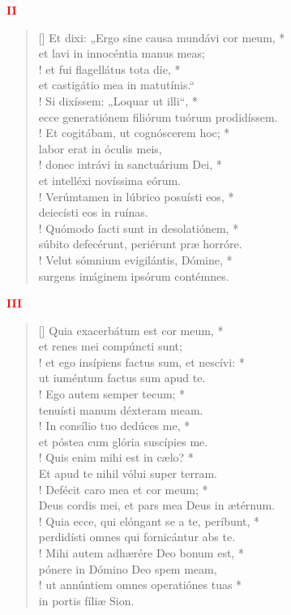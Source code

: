 \begin{center}
\textcolor{red}{\bf II}
\end{center}
\begin{verse}[\versewidth]
Et dixi: „Ergo sine causa mundávi cor meum, *\\
et lavi in innocéntia manus meas;\\!
\vin et fui flagellátus tota die, *\\
\vin et castigátio mea in matutínis.“\\!
Si dixíssem: „Loquar ut illi“, *\\
ecce generatiónem filiórum tuórum prodidíssem.\\!
\vin Et cogitábam, ut cognóscerem hoc; *\\
\vin labor erat in óculis meis,\\!
donec intrávi in sanctuárium Dei, *\\
et intelléxi novíssima eórum.\\!
\vin Verúmtamen in lúbrico posuísti eos, *\\
\vin deiecísti eos in ruínas.\\!
Quómodo facti sunt in desolatiónem, *\\
súbito defecérunt, periérunt præ horróre.\\!
\vin Velut sómnium evigilántis, Dómine, *\\
\vin surgens imáginem ipsórum contémnes.\\
\end{verse}
\begin{center}
\textcolor{red}{\bf III}
\end{center}
\begin{verse}[\versewidth]
Quia exacerbátum est cor meum, *\\
et renes mei compúncti sunt;\\!
\vin et ego insípiens factus sum, et nescívi: *\\
\vin ut iuméntum factus sum apud te.\\!
Ego autem semper tecum; *\\
tenuísti manum déxteram meam.\\!
\vin In consílio tuo dedúces me, *\\
\vin et póstea cum glória suscípies me.\\!
Quis enim mihi est in cælo? *\\
Et apud te nihil vólui super terram.\\!
\vin Defécit caro mea et cor meum; *\\
\vin Deus cordis mei, et pars mea Deus in ætérnum.\\!
Quia ecce, qui elóngant se a te, períbunt, *\\
perdidísti omnes qui fornicántur abs te.\\!
\vin Mihi autem adhærére Deo bonum est, *\\
\vin pónere in Dómino Deo spem meam,\\!
ut annúntiem omnes operatiónes tuas *\\
in portis fíliæ Sion.\\
\end{verse}
\vspace{1cm}


